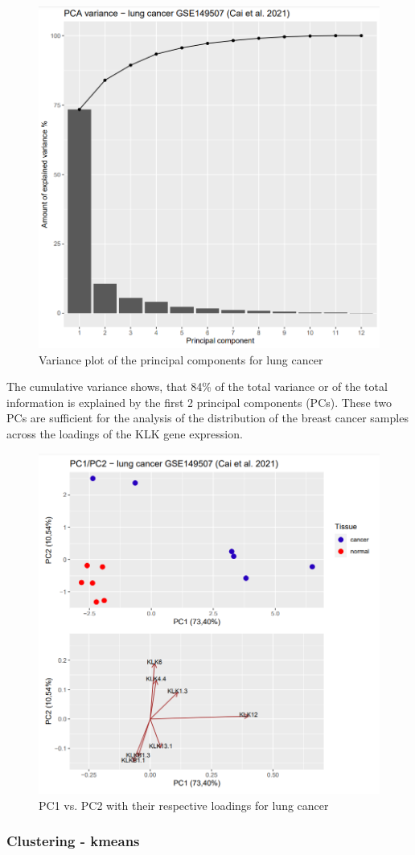 \documentclass[
]{article}
\begin{document}
\begin{figure}

{\centering \includegraphics[width=0.5\linewidth]{images/PCA_variance_lung} 

}

\caption{Variance plot of the principal components for lung cancer}\label{fig:PCA variance - lung }
\end{figure}

The cumulative variance shows, that 84\% of the total variance or of the
total information is explained by the first 2 principal components
(PCs). These two PCs are sufficient for the analysis of the distribution
of the breast cancer samples across the loadings of the KLK gene
expression.\\

\begin{figure}

{\centering \includegraphics[width=0.5\linewidth]{images/PCAplot_lung} 

}

\caption{PC1 vs. PC2 with their respective loadings for lung cancer}\label{fig:PCA plot - lung }
\end{figure}

\hypertarget{clustering---kmeans}{%
\subsubsection{Clustering - kmeans}\label{clustering---kmeans}}
\end{document}
